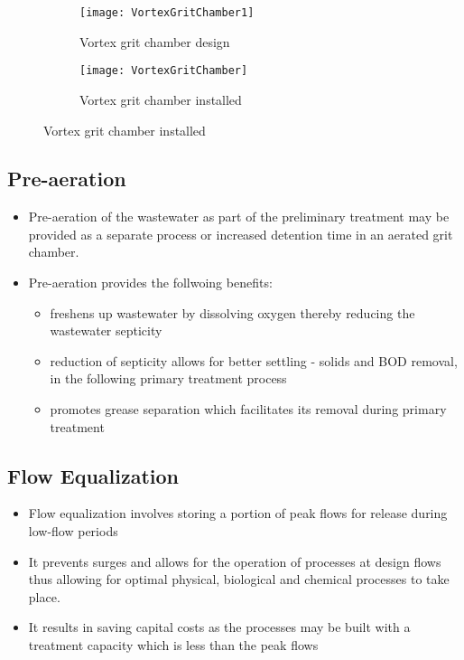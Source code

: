 \documentclass{article}
\begin{document}
\begin{figure}[h!]
  \centering
  \begin{subfigure}[b]{0.47\linewidth}
    \texttt{[image: VortexGritChamber1]}
    \caption{Vortex grit chamber design}
  \end{subfigure}
  \hspace{0.2cm}
  \begin{subfigure}[b]{0.43\linewidth}
    \texttt{[image: VortexGritChamber]}
    \caption{Vortex grit chamber installed}
  \end{subfigure}
\end{figure} 

\subsection{Pre-aeration}	
	\begin{itemize}
		\item Pre-aeration of the wastewater as part of the preliminary treatment may be provided as a separate process or increased detention time in an aerated grit chamber.
		\item Pre-aeration provides the follwoing benefits:
			\begin{itemize}
				\item freshens up wastewater by dissolving oxygen thereby reducing the wastewater septicity
				\item reduction of septicity allows for better settling - solids and BOD removal, in the following primary treatment process
				\item promotes grease separation which facilitates its removal during primary treatment
			\end{itemize}
	\end{itemize}
\subsection{Flow Equalization}	

	\begin{itemize}
		\item Flow equalization involves storing a portion of peak flows for release during low-flow periods
		\item It prevents surges and allows for the operation of processes at design flows thus allowing for optimal physical, biological and chemical processes to take place.
		\item It results in saving capital costs as the processes may be built with a treatment capacity which is less than the peak flows
	\end{itemize}
\newpage
\end{document}
